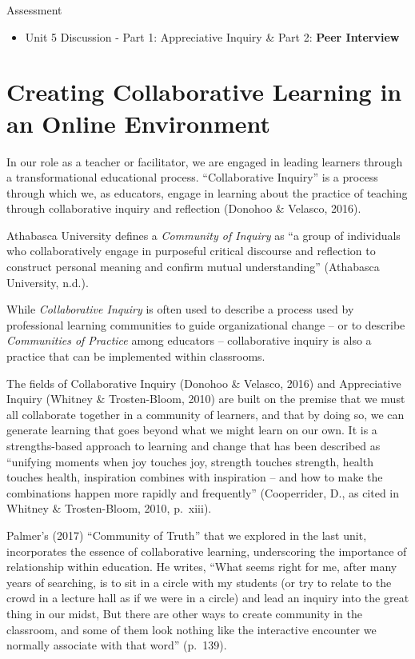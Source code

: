 \documentclass[
]{book}
\providecommand{\tightlist}{%
  \setlength{\itemsep}{0pt}\setlength{\parskip}{0pt}}
\begin{document}
\begin{assessment}
{Assessment}

\begin{itemize}
\tightlist
\item
  Unit 5 Discussion - Part 1: Appreciative Inquiry \& Part 2:
  \textbf{Peer Interview}
\end{itemize}
\end{assessment}

\hypertarget{creating-collaborative-learning-in-an-online-environment}{%
\section{Creating Collaborative Learning in an Online Environment}\label{creating-collaborative-learning-in-an-online-environment}}

In our role as a teacher or facilitator, we are engaged in leading learners through a transformational educational process. ``Collaborative Inquiry'' is a process through which we, as educators, engage in learning about the practice of teaching through collaborative inquiry and reflection (Donohoo \& Velasco, 2016).

Athabasca University defines a \emph{Community of Inquiry} as ``a group of individuals who collaboratively engage in purposeful critical discourse and reflection to construct personal meaning and confirm mutual understanding'' (Athabasca University, n.d.).

While \emph{Collaborative Inquiry} is often used to describe a process used by professional learning communities to guide organizational change -- or to describe \emph{Communities of Practice} among educators -- collaborative inquiry is also a practice that can be implemented within classrooms.

The fields of Collaborative Inquiry (Donohoo \& Velasco, 2016) and Appreciative Inquiry (Whitney \& Trosten-Bloom, 2010) are built on the premise that we must all collaborate together in a community of learners, and that by doing so, we can generate learning that goes beyond what we might learn on our own. It is a strengths-based approach to learning and change that has been described as ``unifying moments when joy touches joy, strength touches strength, health touches health, inspiration combines with inspiration -- and how to make the combinations happen more rapidly and frequently'' (Cooperrider, D., as cited in Whitney \& Trosten-Bloom, 2010, p.~xiii).

Palmer's (2017) ``Community of Truth'' that we explored in the last unit, incorporates the essence of collaborative learning, underscoring the importance of relationship within education. He writes, ``What seems right for me, after many years of searching, is to sit in a circle with my students (or try to relate to the crowd in a lecture hall as if we were in a circle) and lead an inquiry into the great thing in our midst, But there are other ways to create community in the classroom, and some of them look nothing like the interactive encounter we normally associate with that word'' (p.~139).
\end{document}
